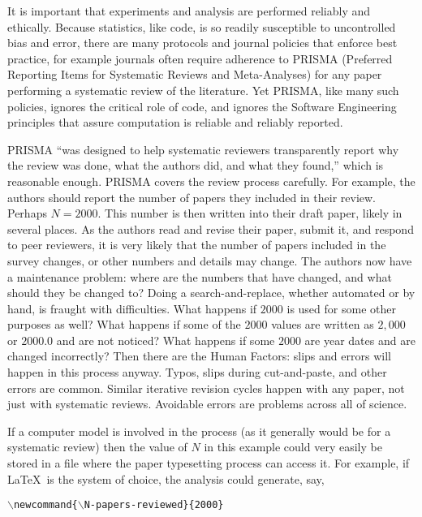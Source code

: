 \documentclass{comjnl}
\begin{document}
It is important that experiments and analysis are performed reliably and ethically. Because statistics, like code, is so readily susceptible to uncontrolled bias and error, there are many protocols and journal policies that enforce best practice, for example journals often require adherence to PRISMA (Preferred Reporting Items for Systematic Reviews and Meta-Analyses) \cite{prisma} for any paper performing a systematic review of the literature. Yet PRISMA, like many such policies, ignores the critical role of code, and ignores the Software Engineering principles that assure computation is reliable and reliably reported. 

PRISMA ``was designed to help systematic reviewers transparently report why the review was done, what the authors did, and what they found,'' which is reasonable enough. PRISMA covers the review process carefully. For example, the authors should report the number of papers they included in their review. Perhaps $N=2000$. This number is then written into their draft paper, likely in several places. As the authors read and revise their paper, submit it, and respond to peer reviewers, it is very likely that the number of papers included in the survey changes, or other numbers and details may change. The authors now have a maintenance problem: where are the numbers that have changed, and what should they be changed to? Doing a search-and-replace, whether automated or by hand, is fraught with difficulties. What happens if $2000$ is used for some other purposes as well? What happens if some of the $2000$ values are written as $2,000$ or $2000.0$ and are not noticed? What happens if some $2000$ are year dates and are changed incorrectly? Then there are the Human Factors:  slips and errors will happen in this process anyway. Typos, slips during cut-and-paste, and other errors are common. Similar iterative revision cycles happen with any paper, not just with systematic reviews. Avoidable errors are problems across all of science.

If a computer model is involved in the process (as it generally would be for a systematic review) then the value of $N$ in this example could very easily be stored in a file where the paper typesetting process can access it. For example, if \LaTeX\ is the system of choice, the analysis could generate, say, 

\begin{center}\texttt{$\backslash$newcommand\{$\backslash$N-papers-reviewed\}\{2000\}}\end{center}
\end{document}
